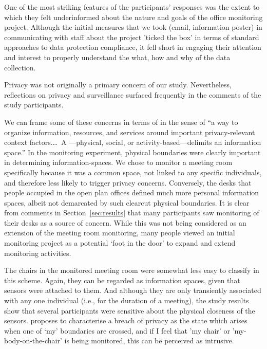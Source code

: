 One of the most striking features of the participants' responses was
the extent to which they felt underinformed about the nature and goals
of the office monitoring project. Although the initial measures that
we took (email, information poster) in communicating with staff about
the project 'ticked the box' in terms of standard approaches to data
protection compliance, it fell short in engaging their attention and
interest to properly understand the what, how and why of the data
collection. 

Privacy was not originally a primary concern of our study. Nevertheless,
reflections on privacy and surveillance surfaced frequently in the
comments of the study participants.

We can frame some of these concerns in terms of  \cite{Jiang-2002-MPCI} in the sense of ``a way to organize
information, resources, and services around important privacy-relevant
context factors.\ldots\ A ---physical, social, or
activity-based---delimits an information space.'' In the monitoring
experiment, physical boundaries were clearly important in determining
information-spaces. We chose to monitor a meeting room specifically
because it was a common space, not linked to any specific individuals,
and therefore less likely to trigger privacy concerns. Conversely, the
desks that people occupied in the open plan offices defined much more
personal information spaces, albeit not demarcated by such clearcut
physical boundaries. It is clear from comments in
Section~\ref{sec:results} that many participants saw monitoring of
their desks as a source of concern. While this was not being
considered as an extension of the meeting room monitoring, many people
viewed an initial monitoring project as a potential ‘foot in the door’
to expand and extend monitoring activities.

The chairs in the monitored meeting room were somewhat less easy to
classify in this scheme. Again, they can be regarded as information
spaces, given that sensors were attached to them. And although they
are only transiently associated with any one individual (i.e., for the
duration of a meeting), the study results show that several participants were
sensitive about the physical closeness of the
sensors. \cite{Ohara-2016-TSVP} proposes to characterise a breach of privacy as
the state which arises when one of `my' boundaries are crossed, and if
I feel that 'my chair' or 'my-body-on-the-chair' is being monitored,
this can be perceived as intrusive. 

